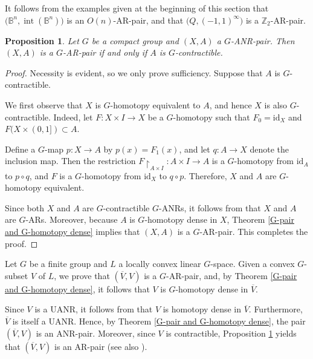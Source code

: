 \documentclass[12pt]{amsart}
\newtheorem{proposition}[theorem]{Proposition}
\theoremstyle{definition}
\begin{document}
	It follows from the examples given at the beginning of this section that $\big(\mathbb{B}^n, \operatorname{int}(\mathbb{B}^n)\big)$ is an $O(n)$-AR-pair, and that $\big(Q, (-1,1)^\infty\big)$ is a $\mathbb{Z}_2$-AR-pair.
	
	\begin{proposition}\label{ANR-pair + contrac = AR-pair}
		\rm{Let $G$ be a compact group and $(X,A)$ a $G$-ANR-pair. Then $(X,A)$ is a $G$-AR-pair if and only if $A$ is $G$-contractible.}
	\end{proposition}
	
	\begin{proof}
		
		Necessity is evident, so we only prove sufficiency. Suppose that $A$ is $G$-contractible. 
		
		We first observe that $X$ is $G$-homotopy equivalent to $A$, and hence $X$ is also $G$-contractible. Indeed, let $F: X\times I\rightarrow X$ be a $G$-homotopy such that $F_0=\text{id}_X$ and $F(X\times (0,1])\subset A$. 
		
		Define a $G$-map $p: X\rightarrow A$ by $p(x)=F_1(x)$, and let $q:A\rightarrow X$ denote the inclusion map. Then the restriction $F\restriction_{A\times I}: A\times I\rightarrow A$ is a $G$-homotopy from $\text{id}_A$ to $p\circ q$, and $F$ is a $G$-homotopy from $\text{id}_X$ to $q\circ p$. Therefore, $X$ and $A$ are $G$-homotopy equivalent.
		
		Since both $X$ and $A$ are $G$-contractible $G$-ANRs, it follows from \cite[Theorem 6]{A2} that $X$ and $A$ are $G$-ARs. Moreover, because $A$ is $G$-homotopy dense in $X$, Theorem \ref{G-pair and G-homotopy dense} implies that $(X,A)$ is a $G$-AR-pair. This completes the proof. 
	\end{proof}
	
	Let $G$ be a finite group and $L$ a locally convex linear $G$-space. Given a convex $G$-subset $V$ of $L$, we prove that $(\overline{V}, V)$ is a $G$-AR-pair, and, by Theorem \ref{G-pair and G-homotopy dense}, it follows that $V$ is $G$-homotopy dense in $\overline{V}$.
	
	Since $V$ is a UANR, it follows from \cite[Theorem 2]{KS1} that  $V$ is homotopy dense in $\overline{V}$. Furthermore, $\overline{V}$ is itself  a UANR. Hence, by Theorem \ref{G-pair and G-homotopy dense}, the pair $(\overline{V}, V)$ is an ANR-pair. Moreover, since $V$ is contractible, Proposition \ref{ANR-pair + contrac = AR-pair} yields that $(\overline{V}, V)$ is an AR-pair  (see also \cite[Corollary 4.2.15]{VM2}).
	
\end{document}
